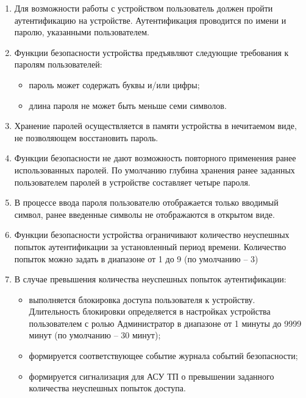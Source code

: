 \color{black}

\begin{enumerate}[label=\arabic{section}.\arabic{subsection}.\arabic*, labelsep=4pt, leftmargin=0pt, itemindent=57pt]

\item
Для возможности работы с устройством пользователь должен пройти аутентификацию на устройстве. Аутентификация проводится по имени и паролю, указанными пользователем. 

\item
Функции безопасности устройства предъявляют следующие требования к паролям пользователей:
\begin{itemize}
    \item пароль может содержать буквы и/или цифры;
    \item длина пароля не может быть меньше семи символов. 
\end{itemize}

\item
Хранение паролей осуществляется в памяти устройства в нечитаемом виде, не позволяющем восстановить пароль.

\item
Функции безопасности не дают возможность повторного применения ранее использованных паролей.
По умолчанию глубина хранения ранее заданных пользователем паролей в устройстве составляет четыре пароля.

\item
В процессе ввода пароля пользователю отображается только вводимый символ, ранее введенные символы не отображаются в открытом виде.

\item
Функции безопасности устройства ограничивают количество неуспешных попыток аутентификации за установленный период времени.
Количество попыток можно задать в диапазоне от 1 до 9 (по умолчанию – 3)

\item
В случае превышения количества неуспешных попыток аутентификации:
\begin{itemize}
    \item выполняется блокировка доступа пользователя к устройству. Длительность блокировки определяется в настройках устройства пользователем с ролью Администратор в диапазоне от 1 минуты до 9999 минут (по умолчанию – 30 минут);
    \item формируется соответствующее событие журнала событий безопасности;
    \item формируется сигнализация для АСУ ТП о превышении заданного количества неуспешных попыток доступа. 
\end{itemize}


\end{enumerate}
